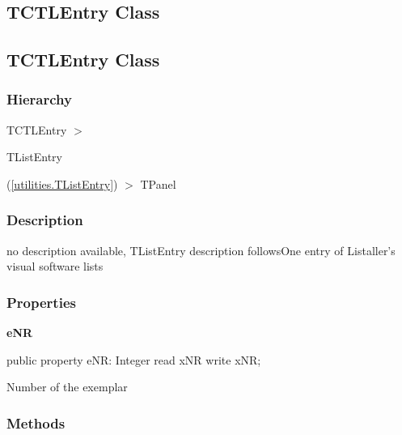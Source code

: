 \documentclass{report}
\newif\ifpdf
\begin{document}
\subsection*{\large{\textbf{TCTLEntry Class}}\normalsize\hspace{1ex}\hrulefill}
\else
\subsection*{TCTLEntry Class}
\fi
\label{swcatalog.TCTLEntry}
\subsubsection*{\large{\textbf{Hierarchy}}\normalsize\hspace{1ex}\hfill}
TCTLEntry {$>$} \begin{ttfamily}TListEntry\end{ttfamily}(\ref{utilities.TListEntry}) {$>$} 
TPanel
\subsubsection*{\large{\textbf{Description}}\normalsize\hspace{1ex}\hfill}
no description available, TListEntry description followsOne entry of Listaller's visual software lists\subsubsection*{\large{\textbf{Properties}}\normalsize\hspace{1ex}\hfill}
\begin{list}{}{
\setlength{\itemindent}{0cm}
\setlength{\listparindent}{0cm}
\setlength{\leftmargin}{\evensidemargin}
\addtolength{\leftmargin}{\tmplength}
\settowidth{\labelsep}{X}
\addtolength{\leftmargin}{\labelsep}
\setlength{\labelwidth}{\tmplength}
}
\label{swcatalog.TCTLEntry-eNR}
\item[\textbf{eNR}\hfill]
\ifpdf
\begin{flushleft}
\fi
\begin{ttfamily}
public property eNR: Integer read xNR write xNR;\end{ttfamily}

\ifpdf
\end{flushleft}
\fi


\par Number of the exemplar\end{list}
\subsubsection*{\large{\textbf{Methods}}\normalsize\hspace{1ex}\hfill}
\end{document}
